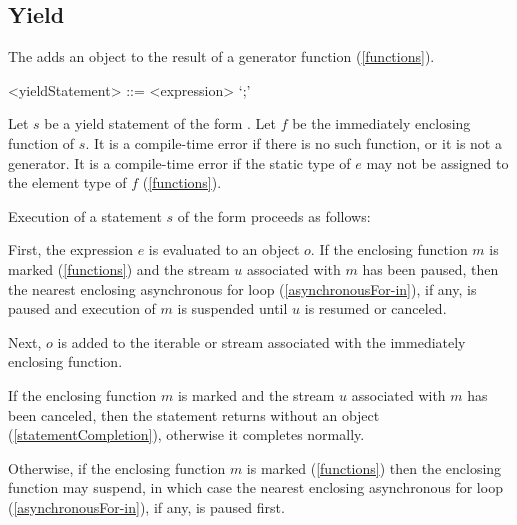 \documentclass[makeidx]{article}
\begin{document}
{\subsection{Yield}

\LMHash{}%
The  adds an object to
the result of a generator function
(\ref{functions}).

\begin{grammar}
<yieldStatement> ::= \YIELD{} <expression> `;'
\end{grammar}

\LMHash{}%
Let $s$ be a yield statement of the form .
Let $f$ be the immediately enclosing function of $s$.
It is a compile-time error if there is no such function,
or it is not a generator.
It is a compile-time error if the static type of $e$
may not be assigned to the element type of $f$
(\ref{functions}).

\LMHash{}%
Execution of a statement $s$ of the form 
proceeds as follows:

\LMHash{}%
First, the expression $e$ is evaluated to an object $o$.
If the enclosing function $m$ is marked \code{\ASYNC*}
(\ref{functions})
and the stream $u$ associated with $m$ has been paused,
then the nearest enclosing asynchronous for loop
(\ref{asynchronousFor-in}),
if any, is paused and execution of $m$ is suspended
until $u$ is resumed or canceled.

\LMHash{}%
Next, $o$ is added to the iterable or stream associated
with the immediately enclosing function.


\LMHash{}%
If the enclosing function $m$ is marked \code{\ASYNC*}
and the stream $u$ associated with $m$ has been canceled,
then the \YIELD{} statement returns without an object
(\ref{statementCompletion}),
otherwise it completes normally.


\LMHash{}%
Otherwise, if the enclosing function $m$ is marked \code{\ASYNC*}
(\ref{functions})
then the enclosing function may suspend,
in which case the nearest enclosing asynchronous for loop
(\ref{asynchronousFor-in}),
if any, is paused first.

}
\end{document}
